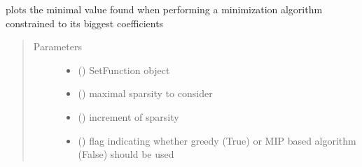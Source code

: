 \documentclass[letterpaper,10pt,english]{sphinxmanual}
\begin{document}
\begin{fulllineitems}
\label{\detokenize{setFTs:setFTs.plotting.plot_minimization_found_biggest_coefs}}
\sphinxAtStartPar
plots the minimal value found when performing a minimization algorithm constrained to its biggest coefficients
\begin{quote}\begin{description}
\item[{Parameters}] \leavevmode\begin{itemize}
\item {} 
\sphinxAtStartPar
{} ({\hyperref[\detokenize{setFTs:setFTs.setfunctions.SetFunction}]{}}) \textendash{} SetFunction object

\item {} 
\sphinxAtStartPar
{} () \textendash{} maximal sparsity to consider

\item {} 
\sphinxAtStartPar
{} () \textendash{} increment of sparsity

\item {} 
\sphinxAtStartPar
{} () \textendash{} flag indicating whether greedy (True) or MIP based algorithm (False) should be used

\end{itemize}

\end{description}\end{quote}

\end{fulllineitems}

\end{document}
